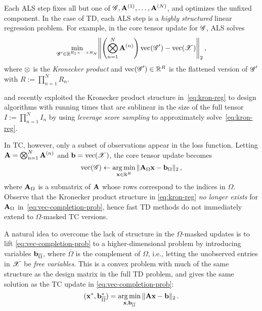 Each ALS step fixes all but one of $\bm{\mathscr{G}}, \mathbf{A}^{(1)}, \dots, \mathbf{A}^{(N)}$, and optimizes the unfixed component.
In the case of TD, each ALS step is a \emph{highly structured} linear regression problem.
For example, in the core tensor update for $\bm{\mathscr{G}}$, ALS solves
\begin{equation}
\label{eq:kron-reg}
    \min_{\tensor{G}' \in\mathbb{R}^{R_1 \times \cdots \times R_N}
    }
    \norm*{\parens*{\bigotimes_{n=1}^N\mat{A}^{(n)}} \vvec(\tensor{G}') - \vvec(\tensor{X})}_2\,,
\end{equation}
where $\otimes$ is the \emph{Kronecker product} and
$\operatorname*{vec}(\bm{\mathscr{G}}') \in \mathbb{R}^{R}$ is the flattened version of $\bm{\mathscr{G}}'$
with $R := \prod_{n=1}^N R_n$.

\citet{diao2019optimal} and \citet{fahrbach2022subquadratic}
recently exploited the Kronecker product structure in~\eqref{eq:kron-reg} to design algorithms with running times that are sublinear in the size of the full tensor $I := \prod_{n=1}^N I_n$
by using \emph{leverage score sampling} to approximately solve~\eqref{eq:kron-reg}.

In TC, however, only a subset of observations appear in the loss function.
Letting $\mathbf{A} = \bigotimes_{n=1}^N\mathbf{A}^{(n)}$ and $\mathbf{b}=\operatorname*{vec}(\bm{\mathscr{X}})$,
the core tensor update becomes
\begin{equation}
\label{eq:vec-completion-prob}
    \operatorname*{vec}(\bm{\mathscr{G}})
    \gets
    \operatorname*{arg\,min}_{\mathbf{x} \in \mathbb{R}^{R}}\, \lVert\mathbf{A}_{\Omega} \mathbf{x} - \mathbf{b}_{\Omega}\rVert_2\,,
\end{equation}
where $\mathbf{A}_{\Omega}$ is a submatrix of $\mathbf{A}$
whose rows correspond to the indices in $\Omega$.
Observe that the Kronecker product structure in \eqref{eq:kron-reg} \emph{no longer exists} for $\mathbf{A}_{\Omega}$ in~\eqref{eq:vec-completion-prob},
hence fast TD methods do not immediately extend to $\Omega$-masked TC versions.


A natural idea to overcome the lack of structure in the $\Omega$-masked updates is to lift \eqref{eq:vec-completion-prob} to a higher-dimensional problem by introducing variables $\mathbf{b}_{\overline{\Omega}}$, where $\overline{\Omega}$ is the complement of $\Omega$,
i.e., letting the unobserved entries in $\bm{\mathscr{X}}$ be \emph{free variables}.
This is a convex problem with much of the same structure as the design matrix in the full TD problem, and gives the same solution as the TC update in \eqref{eq:vec-completion-prob}:
\begin{equation}
\label{eq:lifted-prob}
    (\mathbf{x}^*, \mathbf{b}_{\overline{\Omega}}^*) = \operatorname*{arg\,min}_{\mathbf{x},\mathbf{b}_{\overline{\Omega}}}\, \lVert\mathbf{A} \mathbf{x} - \mathbf{b}\rVert_2\,.
\end{equation}

